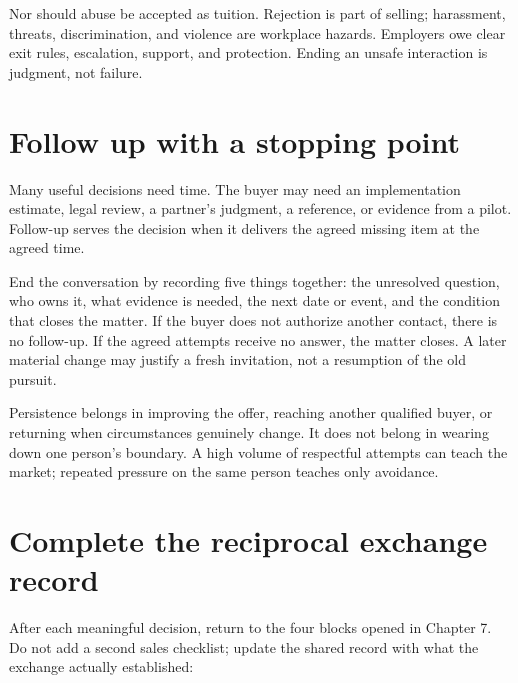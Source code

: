 Nor should abuse be accepted as tuition. Rejection is part of selling;
harassment, threats, discrimination, and violence are workplace hazards.
Employers owe clear exit rules, escalation, support, and protection. Ending an
unsafe interaction is judgment, not failure.

\section{Follow up with a stopping point}

Many useful decisions need time. The buyer may need an implementation estimate,
legal review, a partner's judgment, a reference, or evidence from a pilot.
Follow-up serves the decision when it delivers the agreed missing item at the
agreed time.

End the conversation by recording five things together: the unresolved
question, who owns it, what evidence is needed, the next date or event, and the
condition that closes the matter. If the buyer does not authorize another
contact, there is no follow-up. If the agreed attempts receive no answer, the
matter closes. A later material change may justify a fresh invitation, not a
resumption of the old pursuit.

Persistence belongs in improving the offer, reaching another qualified buyer,
or returning when circumstances genuinely change. It does not belong in
wearing down one person's boundary. A high volume of respectful attempts can
teach the market; repeated pressure on the same person teaches only avoidance.

\section{Complete the reciprocal exchange record}

After each meaningful decision, return to the four blocks opened in Chapter 7.
Do not add a second sales checklist; update the shared record with what the
exchange actually established:

